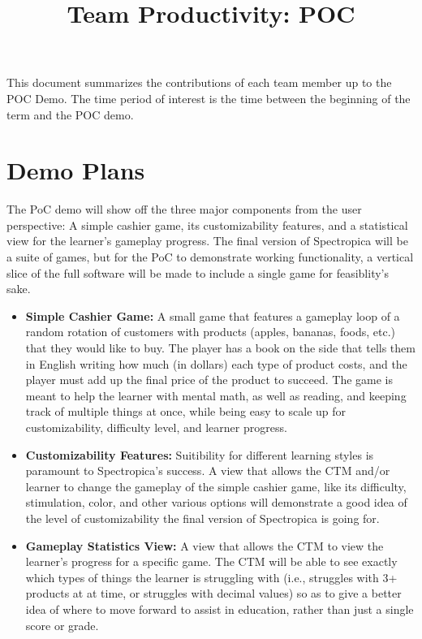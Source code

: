 \documentclass{article}
\title{Team Productivity: POC\\\progname}
\author{\authname}
\date{}
\begin{document}
\maketitle

This document summarizes the contributions of each team member up to the POC
Demo.  The time period of interest is the time between the beginning of the term
and the POC demo.




\section{Demo Plans}

The PoC demo will show off the three major components from the user perspective: A simple cashier game, its customizability features, and a statistical view for the learner's gameplay progress. The final version of Spectropica will be a suite of games, but for the PoC to demonstrate working functionality, a vertical slice of the full software will be made to include a single game for feasiblity's sake.

\begin{itemize}
    \item \textbf{Simple Cashier Game:} A small game that features a gameplay loop of a random rotation of customers with products (apples, bananas, foods, etc.) that they would like to buy. 
    The player has a book on the side that tells them in English writing how much (in dollars) each type of product costs, and the player must add up the final price of the product to succeed.
    The game is meant to help the learner with mental math, as well as reading, and keeping track of multiple things at once, while being easy to scale up for customizability, difficulty level, and learner progress.
    \item \textbf{Customizability Features:} Suitibility for different learning styles is paramount to Spectropica's success. A view that allows the CTM and/or learner to change the gameplay of the simple cashier game, like its difficulty, stimulation, color, and other various options will demonstrate a good idea of the level of customizability the final version of Spectropica is going for.
    \item \textbf{Gameplay Statistics View:} A view that allows the CTM to view the learner's progress for a specific game. The CTM will be able to see exactly which types of things the learner is struggling with (i.e., struggles with 3+ products at at time, or struggles with decimal values) so as to give a better idea of where to move forward to assist in education, rather than just a single score or grade.
\end{itemize}
\end{document}
